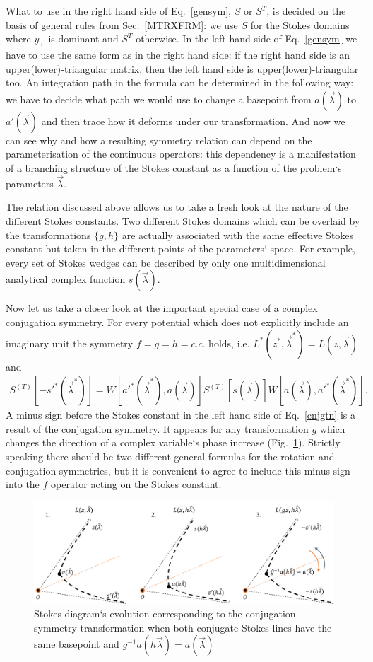 \documentclass[aps,prl,preprint,superscriptaddress]{revtex4}
\begin{document}
What to use in the right hand side of Eq.~\ref{gensym}, $S$ or $S^T$, is decided on the basis of general rules from Sec.~\ref{MTRXFRM}: we use $S$ for the Stokes domains where $y_+$ is dominant and $S^T$ otherwise. In the left hand side of Eq.~\ref{gensym} we have to use the same form as in the right hand side: if the right hand side is an upper(lower)-triangular matrix, then the left hand side is upper(lower)-triangular too. An integration path in the formula can be determined in the following way: we have to decide what path we would use to change a basepoint from $a(\vec{\lambda})$ to $a'(\vec{\lambda})$ and then trace how it deforms under our transformation. And now we can see why and how a resulting symmetry relation can depend on the parameterisation of the continuous operators: this dependency is a manifestation of a branching structure of the Stokes constant as a function of the problem`s parameters $\vec{\lambda}$.

The relation discussed above allows us to take a fresh look at the nature of the different Stokes constants. Two different Stokes domains which can be overlaid by the transformations $\{g,h\}$ are actually associated with the same effective Stokes constant but taken in the different points of the parameters` space. For example, every set of Stokes wedges can be described by only one multidimensional analytical complex function $s(\vec{\lambda})$.

Now let us take a closer look at the important special case of a complex conjugation symmetry. For every potential which does not explicitly include an imaginary unit the symmetry $f=g=h=c.c.$ holds, i.e. $L^*(z^*,\vec{\lambda}^*)=L(z,\vec{\lambda})$ and
\begin{eqnarray}
S^{(T)}[-s'^*(\vec{\lambda}^*)] = 
W[a'^*(\vec{\lambda}^*),a(\vec{\lambda})]S^{(T)}[s(\vec{\lambda})]W[a(\vec{\lambda}),a'^*(\vec{\lambda}^*)].
\label{cnjgtn}
\end{eqnarray}
A minus sign before the Stokes constant in the left hand side of Eq.~\ref{cnjgtn} is a result of the conjugation symmetry. It appears for any transformation $g$ which changes the direction of a complex variable`s phase increase (Fig.~\ref{cs}). Strictly speaking there should be two different general formulas for the rotation and conjugation symmetries, but it is convenient to agree to include this minus sign into the $f$ operator acting on the Stokes constant.

\begin{figure}
\centering
\noindent
\includegraphics[scale=.5]{stuff/cs.png}
\caption{Stokes diagram`s evolution corresponding to the conjugation symmetry transformation when both conjugate Stokes lines have the same basepoint and $g^{-1}a(h\vec{\lambda})=a(\vec{\lambda})$}
\label{cs}
\end{figure} 
\end{document}
